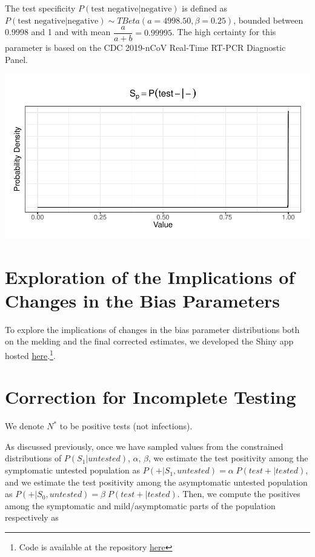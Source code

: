 \documentclass[12pt,twoside]{smiththesis}
\begin{document}
The test specificity \(P(\text{test negative}| \text{negative})\) is defined as \(P(\text{test negative}| \text{negative}) \sim TBeta(a = 4998.50, \beta = 0.25)\), bounded between 0.9998 and 1 and with mean \(\dfrac{a}{a + b} = 0.99995\). The high certainty for this parameter is based on the CDC 2019-nCoV Real-Time RT-PCR Diagnostic Panel.
\begin{center}\includegraphics[width=0.8\linewidth]{thesis_files/figure-latex/unnamed-chunk-64-1} \end{center}

\hypertarget{exploration-of-the-implications-of-changes-in-the-bias-parameters}{%
\section{Exploration of the Implications of Changes in the Bias Parameters}\label{exploration-of-the-implications-of-changes-in-the-bias-parameters}}

To explore the implications of changes in the bias parameter distributions both on the melding and the final corrected estimates, we developed the Shiny app hosted \href{https://q-w-a.shinyapps.io/bayesian_melding_priors/}{here}.\footnote{Code is available at the repository \href{https://github.com/q-w-a/probabilistic_bias_correction}{here}}.

\hypertarget{correction-for-incomplete-testing}{%
\section{Correction for Incomplete Testing}\label{correction-for-incomplete-testing}}

We denote \(N^*\) to be positive tests (not infections).

As discussed previously, once we have sampled values from the constrained distributions of \(P(S_1|untested)\), \(\alpha\), \(\beta\), we estimate the test positivity among the symptomatic untested population as \(P(+|S_1,untested) = \alpha \; P(test +|tested)\), and we estimate the test positivity among the asymptomatic untested population as \(P(+|S_0,untested) = \beta \; P(test +|tested)\). Then, we compute the positives among the symptomatic and mild/asymptomatic parts of the population respectively as
\end{document}
